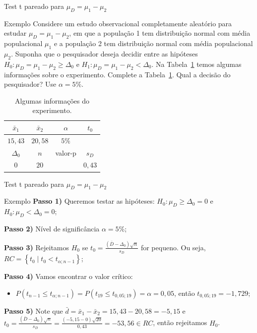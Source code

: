 \documentclass[9pt]{beamer}
\begin{document}
\begin{frame}{Test t pareado para $\mu_D = \mu_1 - \mu_2$}

\begin{block}{Exemplo}
	Considere um estudo observacional completamente aleatório para estudar $\mu_D = \mu_1 - \mu_2$, em que a população 1 tem distribuição normal com média populacional $\mu_1$ e a população 2 tem distribuição normal com média populacional $\mu_2$. Suponha que o pesquisador deseja decidir entre as hipóteses $H_0:\mu_D = \mu_1 - \mu_2 \geq \Delta_0$ e $H_1: \mu_D = \mu_1 - \mu_2 < \Delta_0$. Na Tabela~\ref{tab:test-t-pareado-h1-upper} temos algumas informações sobre o experimento. Complete a Tabela~\ref{tab:test-t-pareado-h1-upper}. Qual a decisão do pesquisador? Use $\alpha = 5\%$.
	
	\begin{table}[htbp]
		\centering
		\begin{tabular}{c|c|c|c}
			\toprule[0.05cm]
			$\bar{x}_1$ & $\bar{x}_2$ & $\alpha$ & $t_0$ \\ \midrule[0.025cm]
			$15,43$ & $20,58$ & $5\%$ &  \\ \midrule[0.05cm]
			$\Delta_0$ & $n$ & valor-p & $s_D$ \\ \midrule[0.025cm]
			$0$ & $20$ &  & $0,43$ \\ \bottomrule[0.05cm]
		\end{tabular}
		\caption{Algumas informações do experimento.}
		\label{tab:test-t-pareado-h1-upper}
	\end{table}
\end{block}

\end{frame}

\begin{frame}{Test t pareado para $\mu_D = \mu_1 - \mu_2$}

\begin{block}{Exemplo}
	\textbf{Passo 1)} Queremos testar as hipóteses: $H_0: \mu_D \geq \Delta_0 = 0$ e $H_0: \mu_D < \Delta_0 = 0$;
	
	\textbf{Passo 2)} Nível de significância $\alpha=5\%$;
	
	\textbf{Passo 3)} Rejeitamos $H_0$ se $t_0 = \frac{(\bar{D} - \Delta_0)\sqrt{n}}{s_D}$ for pequeno. Ou seja, $RC = \left\{ t_0 \mid t_0 < t_{\alpha; n-1} \right\}$;
	
	\textbf{Passo 4)} Vamos encontrar o valor crítico:
	\begin{itemize}
		\item $P(t_{n-1} \leq t_{\alpha; n-1}) = P(t_{19} \leq t_{0,05; 19}) = \alpha = 0,05$, então $t_{0,05; 19} = -1,729$;
	\end{itemize}

	\textbf{Passo 5)} Note que $\bar{d} = \bar{x}_1 - \bar{x}_2 = 15,43 - 20,58 = -5,15$ e $t_0 = \frac{(\bar{D} - \Delta_0)\sqrt{n}}{s_D} = \frac{(-5,15 - 0)\sqrt{20}}{0,43} = -53,56 \in RC$, então rejeitamos $H_0$.
\end{block}

\end{frame}
\end{document}
